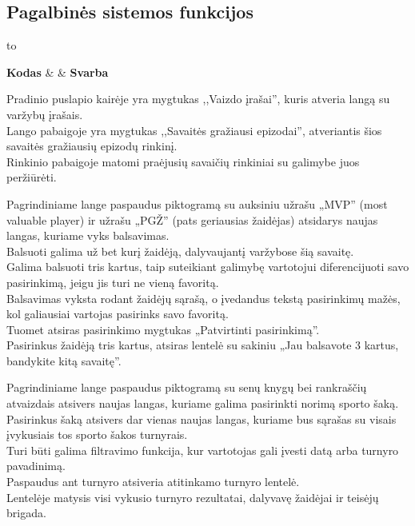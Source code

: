 \documentclass{VUMIFPSkursinis}
\begin{document}
\subsection*{Pagalbinės sistemos funkcijos}
  \begin{longtabu} to 
    \caption{Pagalbinės sistemos funkcijos}
    \label{table:pagalbinesSistemosFunkcijos}
    \endfirsthead
    \endhead
    \hline
    \textbf{Kodas} &  & \textbf{Svarba} \\
    \hline
    
    {
      Pradinio puslapio kairėje yra mygtukas ,,Vaizdo įrašai'', kuris atveria langą su varžybų įrašais. \\
      Lango pabaigoje yra mygtukas ,,Savaitės gražiausi epizodai'', atveriantis šios savaitės gražiausių epizodų rinkinį. \\
      Rinkinio pabaigoje matomi praėjusių savaičių rinkiniai su galimybe juos peržiūrėti.
    }

    {
      Pagrindiniame lange paspaudus piktogramą su auksiniu užrašu „MVP” (most valuable player) ir užrašu „PGŽ” (pats geriausias žaidėjas) 
      atsidarys naujas langas, kuriame vyks balsavimas. \\
      Balsuoti galima už bet kurį žaidėją, dalyvaujantį varžybose šią savaitę. \\
      Galima balsuoti tris kartus, taip suteikiant galimybę vartotojui diferencijuoti savo pasirinkimą, jeigu jis turi ne vieną favoritą. \\
      Balsavimas vyksta rodant žaidėjų sąrašą, o įvedandus tekstą pasirinkimų mažės, kol galiausiai vartojas pasirinks savo favoritą. \\
      Tuomet atsiras pasirinkimo mygtukas „Patvirtinti pasirinkimą”. \\
      Pasirinkus žaidėją tris kartus, atsiras lentelė su sakiniu „Jau balsavote 3 kartus, bandykite kitą savaitę”.
    }
    
    {
      Pagrindiniame lange paspaudus piktogramą su senų knygų bei rankraščių atvaizdais atsivers naujas langas, kuriame galima pasirinkti norimą sporto šaką. \\
      Pasirinkus šaką atsivers dar vienas naujas langas, kuriame bus sąrašas su visais įvykusiais tos sporto šakos turnyrais. \\
      Turi būti galima filtravimo funkcija, kur vartotojas gali įvesti datą arba turnyro pavadinimą. \\
      Paspaudus ant turnyro atsiveria atitinkamo turnyro lentelė. \\
      Lentelėje matysis visi vykusio turnyro rezultatai, dalyvavę žaidėjai ir teisėjų brigada. 
    }
    

\end{longtabu}
\end{document}
